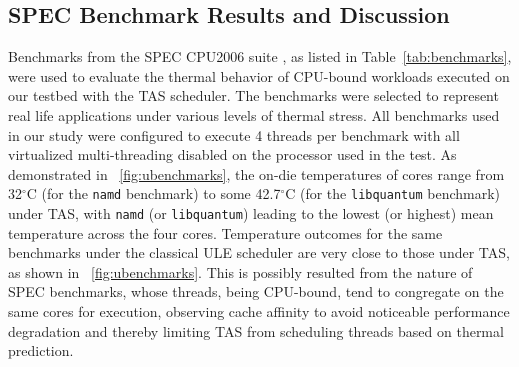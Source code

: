 \documentclass[times, 10pt,twocolumn]{IEEEtran}
\begin{document}
\subsection{SPEC Benchmark Results and Discussion}
\label{sec:microarch} 
Benchmarks from the SPEC CPU2006 suite \cite{Spec2006}, as listed in
Table~\ref{tab:benchmarks}, were used to evaluate the thermal behavior
of CPU-bound workloads executed on our testbed with the TAS scheduler.
The benchmarks were selected to represent real life applications under
various levels of thermal stress.  All benchmarks used in our study were
configured to execute 4 threads per benchmark with all virtualized
multi-threading disabled on the processor used in the test.  As
demonstrated in \figurename~\ref{fig:ubenchmarks}, the on-die
temperatures of cores range from 32$^\circ$C (for the \texttt{namd}
benchmark) to some 42.7$^\circ$C (for the \texttt{libquantum} benchmark)
under TAS, with \texttt{namd} (or \texttt{libquantum}) leading to the
lowest (or highest) mean temperature across the four cores.  Temperature
outcomes for the same benchmarks under the classical ULE scheduler are
very close to those under TAS, as shown in
\figurename~\ref{fig:ubenchmarks}.  This is possibly resulted from the
nature of SPEC benchmarks, whose threads, being CPU-bound, tend to
congregate on the same cores for execution, observing cache affinity to
avoid noticeable performance degradation and thereby limiting TAS from
scheduling threads based on thermal prediction.

\end{document}

